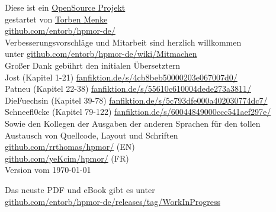 \newpage
\begin{center}
\noindent
\vfill
Diese ist ein \href{https://github.com/entorb/hpmor-de/}{OpenSource Projekt}\\
gestartet von \href{https://entorb.net}{Torben Menke}\\
{\small\href{https://github.com/entorb/hpmor-de/}{github.com/entorb/hpmor-de/}}\\

\vspace*{1\baselineskip}
Verbesserungsvorschläge und Mitarbeit sind herzlich willkommen\\
unter {\small\href{https://github.com/entorb/hpmor-de/wiki/Mitmachen}{github.com/entorb/hpmor-de/wiki/Mitmachen}}\\

\vspace*{1\baselineskip}
Großer Dank gebührt den initialen Übersetztern\\
Jost (Kapitel 1-21) {\small\href{https://www.fanfiktion.de/s/4cb8beb50000203e067007d0/}{fanfiktion.de/s/4cb8beb50000203e067007d0/}}\\
Patneu (Kapitel 22-38) {\small\href{https://www.fanfiktion.de/s/55610c610004dede273a3811/}{fanfiktion.de/s/55610c610004dede273a3811/}}\\
DieFuechsin (Kapitel 39-78) {\small\href{https://www.fanfiktion.de/s/5c793dfe000a402030774dc7/}{fanfiktion.de/s/5c793dfe000a402030774dc7/}}\\
Schneefl0cke (Kapitel 79-122) {\small\href{https://www.fanfiktion.de/s/60044849000ccc541aef297e/}{fanfiktion.de/s/60044849000ccc541aef297e/}}\\

\vspace*{1\baselineskip}
Sowie den Kollegen der Ausgaben der anderen Sprachen für den tollen\\
Austausch von Quellcode, Layout und Schriften\\
{\small\href{https://github.com/rrthomas/hpmor/}{github.com/rrthomas/hpmor/}} (EN)\\
{\small\href{https://github.com/yeKcim/hpmor/}{github.com/yeKcim/hpmor/}} (FR)\\

\vspace*{1\baselineskip}
Version vom \today{}

\vspace*{1\baselineskip}
Das neuste PDF und eBook gibt es unter\\
{\small\href{https://github.com/entorb/hpmor-de/releases/tag/WorkInProgress}{github.com/entorb/hpmor-de/releases/tag/WorkInProgress}}\\
\end{center}

